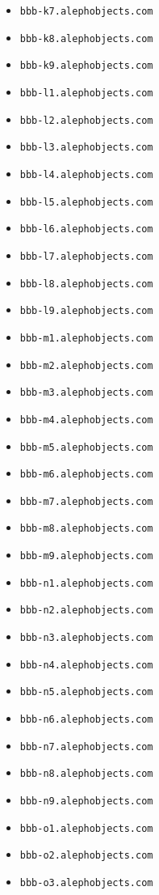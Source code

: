 \begin{itemize}
\item \texttt{bbb-k7.alephobjects.com}
\item \texttt{bbb-k8.alephobjects.com}
\item \texttt{bbb-k9.alephobjects.com}
\item \texttt{bbb-l1.alephobjects.com}
\item \texttt{bbb-l2.alephobjects.com}
\item \texttt{bbb-l3.alephobjects.com}
\item \texttt{bbb-l4.alephobjects.com}
\item \texttt{bbb-l5.alephobjects.com}
\item \texttt{bbb-l6.alephobjects.com}
\item \texttt{bbb-l7.alephobjects.com}
\item \texttt{bbb-l8.alephobjects.com}
\item \texttt{bbb-l9.alephobjects.com}
\item \texttt{bbb-m1.alephobjects.com}
\item \texttt{bbb-m2.alephobjects.com}
\item \texttt{bbb-m3.alephobjects.com}
\item \texttt{bbb-m4.alephobjects.com}
\item \texttt{bbb-m5.alephobjects.com}
\item \texttt{bbb-m6.alephobjects.com}
\item \texttt{bbb-m7.alephobjects.com}
\item \texttt{bbb-m8.alephobjects.com}
\item \texttt{bbb-m9.alephobjects.com}
\item \texttt{bbb-n1.alephobjects.com}
\item \texttt{bbb-n2.alephobjects.com}
\item \texttt{bbb-n3.alephobjects.com}
\item \texttt{bbb-n4.alephobjects.com}
\item \texttt{bbb-n5.alephobjects.com}
\item \texttt{bbb-n6.alephobjects.com}
\item \texttt{bbb-n7.alephobjects.com}
\item \texttt{bbb-n8.alephobjects.com}
\item \texttt{bbb-n9.alephobjects.com}
\item \texttt{bbb-o1.alephobjects.com}
\item \texttt{bbb-o2.alephobjects.com}
\item \texttt{bbb-o3.alephobjects.com}

\end{itemize}
